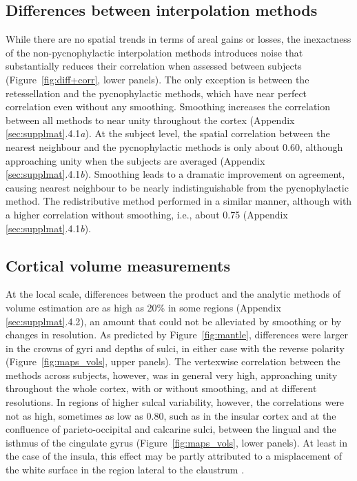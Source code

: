 \subsection{Differences between interpolation methods}

While there are no spatial trends in terms of areal gains or losses, the inexactness of the non-pycnophylactic interpolation methods introduces noise that substantially reduces their correlation when assessed between subjects (Figure~\ref{fig:diff+corr}, lower panels). The only exception is between the retessellation and the pycnophylactic methods, which have near perfect correlation even without any smoothing. Smoothing increases the correlation between all methods to near unity throughout the cortex (Appendix \ref{sec:supplmat}.4.1\emph{a}). At the subject level, the spatial correlation between the nearest neighbour and the pycnophylactic methods is only about 0.60, although approaching unity when the subjects are averaged (Appendix \ref{sec:supplmat}.4.1\emph{b}). Smoothing leads to a dramatic improvement on agreement, causing nearest neighbour to be nearly indistinguishable from the pycnophylactic method. The redistributive method performed in a similar manner, although with a higher correlation without smoothing, i.e., about 0.75 (Appendix \ref{sec:supplmat}.4.1\emph{b}).

\subsection{Cortical volume measurements}

At the local scale, differences between the product and the analytic methods of volume estimation are as high as 20\% in some regions (Appendix \ref{sec:supplmat}.4.2), an amount that could not be alleviated by smoothing or by changes in resolution. As predicted by Figure~\ref{fig:mantle}, differences were larger in the crowns of gyri and depths of sulci, in either case with the reverse polarity (Figure~\ref{fig:maps_vols}, upper panels). The vertexwise correlation between the methods across subjects, however, was in general very high, approaching unity throughout the whole cortex, with or without smoothing, and at different resolutions. In regions of higher sulcal variability, however, the correlations were not as high, sometimes as low as 0.80, such as in the insular cortex and at the confluence of parieto-occipital and calcarine sulci, between the lingual and the isthmus of the cingulate gyrus (Figure~\ref{fig:maps_vols}, lower panels). At least in the case of the insula, this effect may be partly attributed to a misplacement of the white surface in the region lateral to the claustrum \citep{Glasser2016}.

